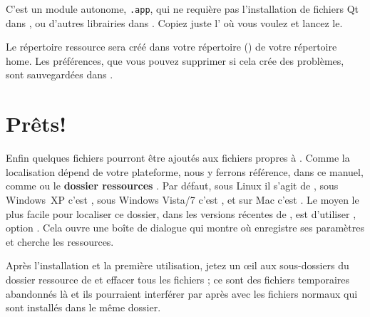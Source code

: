 C'est un module autonome, \texttt{.app}, qui ne requière pas l'installation de fichiers Qt dans , ou d'autres librairies dans . Copiez juste l' où vous voulez et lancez le.

Le répertoire ressource \Tw{} sera créé dans votre répertoire  () de votre répertoire home. Les préférences, que vous pouvez supprimer si cela crée des problèmes, sont sauvegardées dans  .

\section{Prêts!}

Enfin quelques fichiers pourront être ajoutés aux fichiers \og propres\fg{} à \Tw. Comme la localisation dépend de votre plateforme, nous y ferrons référence, dans ce manuel, comme  ou le \textbf{dossier ressources \Tw}.
Par défaut, sous Linux il s'agit de , sous Windows~XP c'est , sous Windows Vista/7 c'est , et sur Mac c'est .
Le moyen le plus facile pour localiser ce dossier, dans les versions récentes de \Tw, est d'utiliser , option \submenu{}. Cela ouvre une boîte de dialogue qui montre où \Tw{} enregistre ses paramètres et cherche les ressources.

Après l'installation et la première utilisation, jetez un œil aux sous-dossiers du dossier ressource de \Tw{} et effacer tous les fichiers ; ce sont des fichiers temporaires abandonnés là et ils pourraient interférer par après avec les fichiers normaux qui sont installés dans le même dossier.
